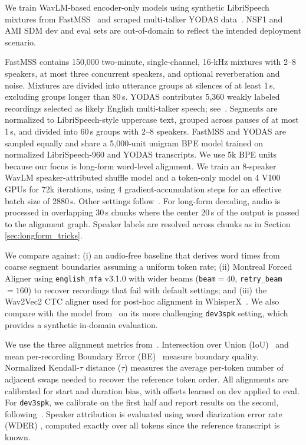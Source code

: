 We train WavLM-based \cite{chen2022wavlm} encoder-only models using synthetic LibriSpeech mixtures from FastMSS~\cite{polokfastmss} and scraped multi-talker YODAS data~\cite{li2023yodas}. NSF1 and AMI SDM dev and eval sets are out-of-domain to reflect the intended deployment scenario.

FastMSS contains 150,000 two-minute, single-channel, 16-kHz mixtures with 2--8 speakers, at most three concurrent speakers, and optional reverberation and noise. Mixtures are divided into utterance groups at silences of at least 1\,s, excluding groups longer than 80\,s. YODAS contributes 5,360 weakly labeled recordings selected as likely English multi-talker speech; see~\cite{polok2027other}. Segments are normalized to LibriSpeech-style uppercase text, grouped across pauses of at most 1\,s, and divided into 60\,s groups with 2--8 speakers. FastMSS and YODAS are sampled equally and share a 5,000-unit unigram BPE model trained on normalized LibriSpeech-960 and YODAS transcripts. We use 5k BPE units because our focus is long-form word-level alignment. We train an 8-speaker WavLM speaker-attributed shuffle model and a token-only model on 4 V100 GPUs for 72k iterations, using 4 gradient-accumulation steps for an effective batch size of 2880\,s. Other settings follow~\cite{wiesner2026modeling}. For long-form decoding, audio is processed in overlapping 30\,s chunks where the center 20\,s of the output is passed to the alignment graph. Speaker labels are resolved across chunks as in Section \ref{sec:longform_tricks}.

We compare against: (i) an audio-free baseline that derives word times from coarse segment boundaries assuming a uniform token rate; (ii) Montreal Forced Aligner using \texttt{english\_mfa} v3.1.0 with wider beams (\texttt{beam}$=40$, \texttt{retry\_beam}$=160$) to recover recordings that fail with default settings; and (iii) the Wav2Vec2 CTC aligner used for post-hoc alignment in WhisperX~\cite{bain2023whisperx}. We also compare with the model from~\cite{wiesner2026modeling} on its more challenging \texttt{dev3spk} setting, which provides a synthetic in-domain evaluation.

We use the three alignment metrics from~\cite{wiesner2026modeling}. Intersection over Union (IoU)~\cite{jaccard1901etude} and mean per-recording Boundary Error (BE)~\cite{huang2024less} measure boundary quality. Normalized Kendall-$\tau$ distance ($\tau$) measures the average per-token number of adjacent swaps needed to recover the reference token order. All alignments are calibrated for start and duration bias, with offsets learned on dev applied to eval. For \texttt{dev3spk}, we calibrate on the first half and report results on the second, following~\cite{wiesner2026modeling}. Speaker attribution is evaluated using word diarization error rate (WDER) \cite{shafey19_interspeech}, computed exactly over all tokens since the reference transcript is known.
 


